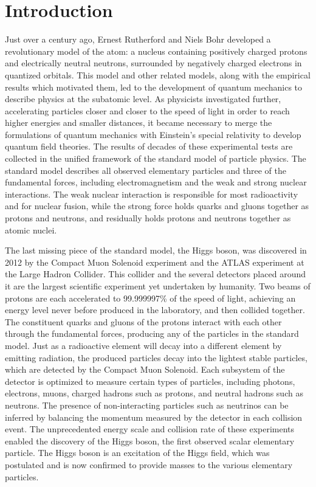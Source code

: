 \documentclass[12pt]{thesis}  %
\renewcommand{\baselinestretch}{2}
\begin{document}
\newpage
\setlength{\parskip}{0em}
\renewcommand{\baselinestretch}{2}
\normalsize

\setcounter{page}{1}
\chapter{Introduction
\label{ch:introduction}}

Just over a century ago, Ernest Rutherford and Niels Bohr developed a revolutionary model of the atom: a nucleus containing positively charged protons and electrically neutral neutrons, surrounded by negatively charged electrons in quantized orbitals. This model and other related models, along with the empirical results which motivated them, led to the development of quantum mechanics to describe physics at the subatomic level. As physicists investigated further, accelerating particles closer and closer to the speed of light in order to reach higher energies and smaller distances, it became necessary to merge the formulations of quantum mechanics with Einstein's special relativity to develop quantum field theories. The results of decades of these experimental tests are collected in the unified framework of the standard model of particle physics. The standard model describes all observed elementary particles and three of the fundamental forces, including electromagnetism and the weak and strong nuclear interactions. The weak nuclear interaction is responsible for most radioactivity and for nuclear fusion, while the strong force holds quarks and gluons together as protons and neutrons, and residually holds protons and neutrons together as atomic nuclei.

The last missing piece of the standard model, the Higgs boson, was discovered in 2012 by the Compact Muon Solenoid experiment and the ATLAS experiment at the Large Hadron Collider. This collider and the several detectors placed around it are the largest scientific experiment yet undertaken by humanity. Two beams of protons are each accelerated to 99.999997\% of the speed of light, achieving an energy level never before produced in the laboratory, and then collided together. The constituent quarks and gluons of the protons interact with each other through the fundamental forces, producing any of the particles in the standard model. Just as a radioactive element will decay into a different element by emitting radiation, the produced particles decay into the lightest stable particles, which are detected by the Compact Muon Solenoid. Each subsystem of the detector is optimized to measure certain types of particles, including photons, electrons, muons, charged hadrons such as protons, and neutral hadrons such as neutrons. The presence of non-interacting particles such as neutrinos can be inferred by balancing the momentum measured by the detector in each collision event. The unprecedented energy scale and collision rate of these experiments enabled the discovery of the Higgs boson, the first observed scalar elementary particle. The Higgs boson is an excitation of the Higgs field, which was postulated and is now confirmed to provide masses to the various elementary particles.
\end{document}
